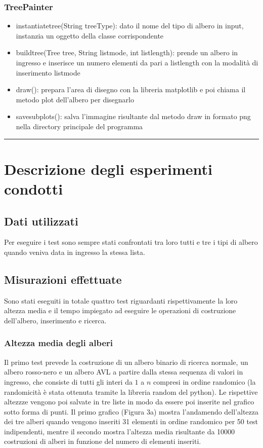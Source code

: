 \documentclass[a4paper,12pt]{article}
\begin{document}
    \subsubsection{TreePainter}
    \begin{itemize}
        \item instantiate\textunderscore tree(String treeType): dato il nome del tipo di albero in input, instanzia un oggetto
        della classe corrispondente
        \item build\textunderscore tree(Tree tree, String list\textunderscore mode, int list\textunderscore length): prende un albero in ingresso e inserisce un
        numero elementi da pari a list\textunderscore length con la modalità di inserimento list\textunderscore mode
        \item draw(): prepara l'area di disegno con la libreria matplotlib e poi chiama il metodo plot dell'albero
        per disegnarlo
        \item save\textunderscore subplots(): salva l'immagine risultante dal metodo draw in formato png nella directory principale
        del programma
    \end{itemize}

    \par\noindent\rule{\textwidth}{0.2pt}
    \section{Descrizione degli esperimenti condotti}

    \subsection{Dati utilizzati}
    Per eseguire i test sono sempre stati confrontati tra loro tutti e tre i tipi di albero quando veniva data in
    ingresso la stessa lista.

    \subsection{Misurazioni effettuate}
    Sono stati eseguiti in totale quattro test riguardanti rispettivamente la loro altezza media e il tempo impiegato
    ad eseguire le operazioni di costruzione dell'albero, inserimento e ricerca.
    \subsubsection{Altezza media degli alberi}
    Il primo test prevede la costruzione di un albero binario di ricerca normale, un albero rosso-nero e un albero
    AVL a partire dalla stessa sequenza di valori in ingresso, che consiste di tutti gli interi da $1$ a $n$ compresi
    in ordine randomico (la randomicità è stata ottenuta tramite la libreria random del python). Le rispettive altezzze
    vengono poi salvate in tre liste in modo da essere poi inserite nel grafico sotto forma di punti.
    Il primo grafico (Figura 3a) mostra l'andamendo dell'altezza dei tre alberi quando vengono inseriti 31 elementi
    in ordine randomico per 50 test indipendenti, mentre il secondo mostra l'altezza media risultante da 10000
    costruzioni di alberi in funzione del numero di elementi inseriti.
\end{document}
